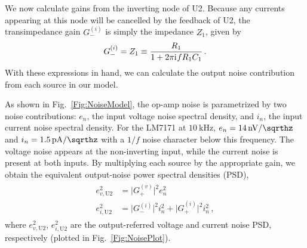 \documentclass[aip,rsi,reprint]{revtex4-1} %
\newcommand{\iu}{\mathrm{i}\mkern1mu}
\begin{document}
We now calculate gains from the inverting node of U2.
Because any currents appearing at this node will be cancelled by the feedback of U2, the transimpedance gain $G_{-}^{(i)}$ is simply the impedance $Z_1$, given by
\begin{align}
G_{-}^{(i)} = Z_1 \equiv \frac{R_1}{1+2\pi \iu f R_1 C_1}\,.
\end{align}
With these expressions in hand, we can calculate the output noise contribution from each source in our model.

As shown in Fig.~\ref{Fig:NoiseModel}, the op-amp noise is parametrized by two noise contributions: $e_n$, the input voltage noise spectral density, and $i_n$, the input current noise spectral density.
For the LM7171 at $\SI{10}{\kilo\hertz}$, $e_n = \SI[per-mode=symbol]{14}{\nano\volt\per\sqrthz}$ and $i_n = \SI[per-mode=symbol]{1.5}{\pico\ampere\per\sqrthz}$ with a $1/f$ noise character below this frequency.\cite{LM7171Datasheet}
The voltage noise appears at the non-inverting input, while the current noise is present at both inputs.
By multiplying each source by the appropriate gain, we obtain the equivalent output-noise power spectral densities (PSD),
\begin{align}
\begin{split}
e^2_{v,\text{U2}} &= \big|G_{+}^{(v)}\big|^2 e^2_n \\
e^2_{i,\text{U2}} &= \big|G_{-}^{(i)}\big|^2 i^2_n + \big|G_{+}^{(i)}\big|^2 i^2_n\,,
\end{split}
\end{align}
where  $e^2_{v,\text{U2}}$, $e^2_{i,\text{U2}}$ are the output-referred voltage and current noise PSD, respectively (plotted in Fig.~\ref{Fig:NoisePlot}).
\end{document}
